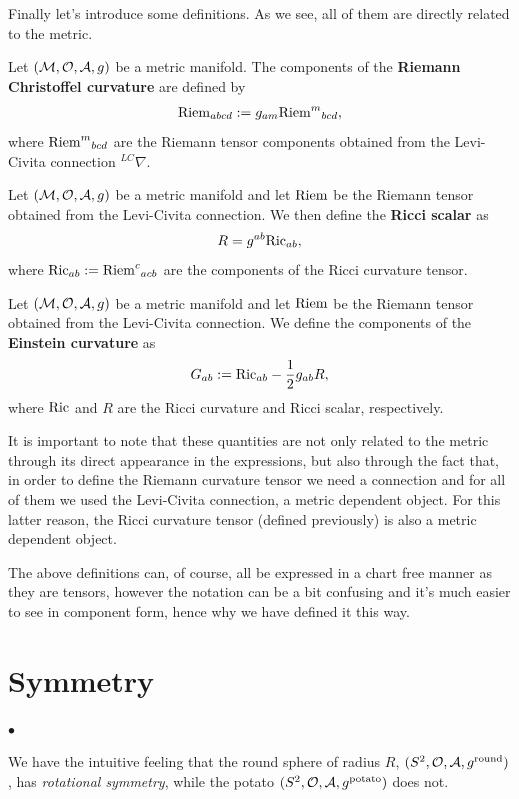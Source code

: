 \documentclass[12pt]{article} %
\begin{document}
Finally let's introduce some definitions. As we see, all of them are directly related to the metric.

    Let $(\mathcal{M},\mathcal{O},\mathcal{A},g)$ be a metric manifold. The components of the  \textbf{Riemann Christoffel curvature} are defined by  
    \begin{align*}
        \mathrm{Riem}_{abcd} := g_{am}{\mathrm{Riem}^m}_{bcd},
    \end{align*}
    where ${\mathrm{Riem}^m}_{bcd}$ are the Riemann tensor components obtained from the Levi-Civita connection $^{LC}\nabla$. 
\ed 

    Let $(\mathcal{M},\mathcal{O},\mathcal{A},g)$ be a metric manifold and let $\mathrm{Riem}$ be the Riemann tensor obtained from the Levi-Civita connection. We then define the \textbf{Ricci scalar} as 
    \begin{align*}
        R = g^{ab}\text{Ric}_{ab},
    \end{align*}
    where $\text{Ric}_{ab}:={\mathrm{Riem}^c}_{acb}$ are the components of the Ricci curvature tensor.
\ed 

    Let $(\mathcal{M},\mathcal{O},\mathcal{A},g)$ be a metric manifold and let $\mathrm{Riem}$ be the Riemann tensor obtained from the Levi-Civita connection. We define the components of the \textbf{Einstein curvature} as
    \begin{align*}
        G_{ab} := \text{Ric}_{ab} - \frac{1}{2}g_{ab}R,
    \end{align*}
    where $\text{Ric}$ and $R$ are the Ricci curvature and Ricci scalar, respectively.
\ed 
\begin{rema}
 It is important to note that these quantities are not only related to the metric through its direct appearance in the expressions, but also through the fact that, in order to define the Riemann curvature tensor we need a connection and for all of them we used the Levi-Civita connection, a metric dependent object. For this latter reason, the Ricci curvature tensor (defined previously) is also a metric dependent object.
\end{rema}
\br 
    The above definitions can, of course, all be expressed in a chart free manner as they are tensors, however the notation can be a bit confusing and it's much easier to see in component form, hence why we have defined it this way. 
\er 
\section{Symmetry}
$\bullet$ 

We have the intuitive feeling that the round sphere of radius $R$, $(S^2,\mathcal{O},\mathcal{A},g^{\text{round}})$, has \textit{rotational symmetry}, while the potato $(S^2,\mathcal{O},\mathcal{A},g^{\text{potato}})$ does not. 
\end{document}
